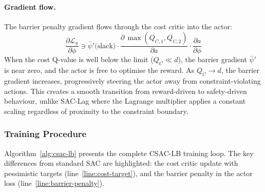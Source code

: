 \paragraph{Gradient flow.}
The barrier penalty gradient flows through the cost critic into the actor:
\begin{equation}
  \frac{\partial \mathcal{L}_\pi}{\partial \phi} \ni
    \bar{\psi}'\!\bigl(\text{slack}\bigr) \cdot
    \frac{\partial\, \max(Q_{C,1}, Q_{C,2})}{\partial a} \cdot
    \frac{\partial a}{\partial \phi}
  \label{eq:barrier-gradient}
\end{equation}
When the cost Q-value is well below the limit ($Q_C \ll d$), the barrier
gradient $\bar{\psi}'$ is near zero, and the actor is free to optimise the
reward.  As $Q_C \to d$, the barrier gradient increases, progressively
steering the actor away from constraint-violating actions.  This creates
a smooth transition from reward-driven to safety-driven behaviour, unlike
SAC-Lag where the Lagrange multiplier applies a constant scaling regardless of
proximity to the constraint boundary.

\subsubsection{Training Procedure}

Algorithm~\ref{alg:csac-lb} presents the complete CSAC-LB training loop.
The key differences from standard SAC are highlighted: the cost critic update
with pessimistic targets (line~\ref{line:cost-target}), and the barrier penalty
in the actor loss (line~\ref{line:barrier-penalty}).

